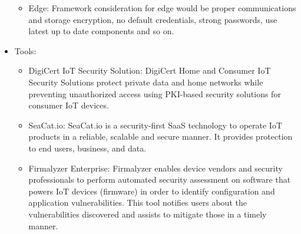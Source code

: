 \begin{itemize}
\begin{itemize}
        \item Edge: Framework consideration for edge would be proper communications and storage encryption, no default credentials, strong passwords, use latest up to date components and so on.
    \end{itemize}
    \item Tools:
    \begin{itemize}
        \item DigiCert IoT Security Solution: DigiCert Home and Consumer IoT Security Solutions protect private data and home networks while preventing unauthorized access using PKI-based security solutions for consumer IoT devices.
        \item SeaCat.io: SeaCat.io is a security-first SaaS technology to operate IoT products in a reliable, scalable and secure manner. It provides protection to end users, business, and data.
        \item Firmalyzer Enterprise: Firmalyzer enables device vendors and security professionals to perform automated security assessment on software that powers IoT devices (firmware) in order to identify configuration and application vulnerabilities. This tool notifies users about the vulnerabilities discovered and assists to mitigate those in a timely manner.
    \end{itemize}
\end{itemize}
